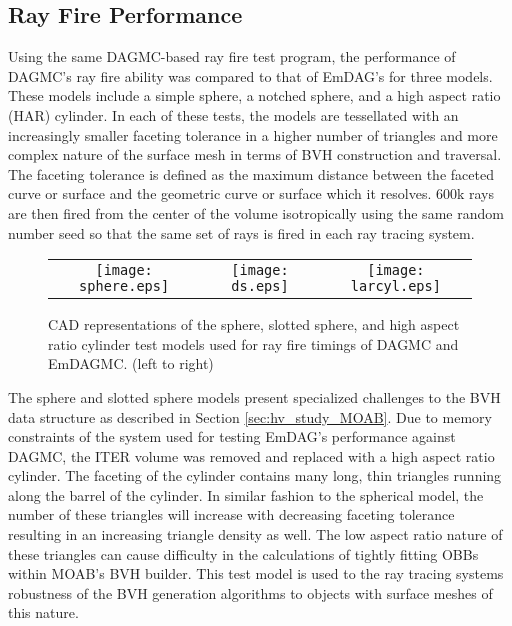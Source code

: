 \subsection{Ray Fire Performance}\label{subsubsec:emdag_rf_performance}

Using the same DAGMC-based ray fire test program, the performance of DAGMC's ray
fire ability was compared to that of EmDAG's for three models. These models
include a simple sphere, a notched sphere, and a high aspect ratio (HAR)
cylinder. In each of these tests, the models are tessellated with an
increasingly smaller faceting tolerance in a higher number of triangles and more
complex nature of the surface mesh in terms of BVH construction and
traversal. The faceting tolerance is defined as the maximum distance between the
faceted curve or surface and the geometric curve or surface which it
resolves. 600k rays are then fired from the center of the volume isotropically
using the same random number seed so that the same set of rays is fired in each
ray tracing system.

\begin{figure}[H]
  \begin{center}
    \begin{tabular}{ccc}
      \texttt{[image: sphere.eps]} &
      \texttt{[image: ds.eps]} &
      \texttt{[image: larcyl.eps]} \\
    \end{tabular}
    \caption{CAD representations of the sphere, slotted sphere, and high aspect
      ratio cylinder test models used for ray fire timings of DAGMC and
      EmDAGMC. (left to right) \label{models}}
  \end{center}
\end{figure} 

The sphere and slotted sphere models present specialized challenges to the BVH
data structure as described in Section \ref{sec:hv_study_MOAB}. Due to memory constraints
of the system used for testing EmDAG's performance against DAGMC, the ITER
volume was removed and replaced with a high aspect ratio cylinder. The faceting
of the cylinder contains many long, thin triangles running along the barrel of
the cylinder. In similar fashion to the spherical model, the number of these
triangles will increase with decreasing faceting tolerance resulting in an
increasing triangle density as well. The low aspect ratio nature of these
triangles can cause difficulty in the calculations of tightly fitting OBBs
within MOAB's BVH builder. This test model is used to the ray tracing systems
robustness of the BVH generation algorithms to objects with surface meshes of
this nature.

